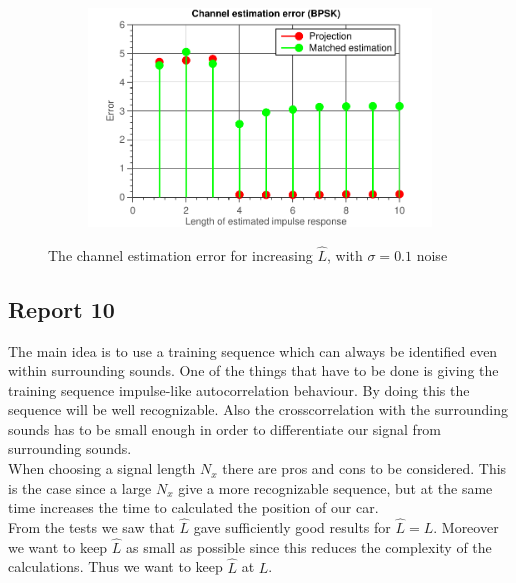 \documentclass[11pt,titlepage]{report}
\begin{document}
\begin{figure}[H]
\begin{subfigure}{0.49\textwidth}
	\end{subfigure}
	\begin{subfigure}{0.49\textwidth}
		\includegraphics[width=\textwidth]{../../deliverable-7-resources/figures/ass-1/report-8-9-10/report-9-noise-0.1/ass-1-report-9-BPSK.pdf}
	\end{subfigure}
	\caption{The channel estimation error for increasing $\hat{L}$, with $\sigma = 0.1$ noise}
	\label{fig:rep901}
\end{figure}


\subsection{Report 10}
The main idea is to use a training sequence which can always be identified even within surrounding sounds. One of the things that have to be done is giving the training sequence impulse-like autocorrelation behaviour. By doing this the sequence will be well recognizable. Also the crosscorrelation with the surrounding sounds has to be small enough in order to differentiate our signal from surrounding sounds. \\
When choosing a signal length $N_x$ there are pros and cons to be considered. This is the case since a large $N_x$ give a more recognizable sequence, but at the same time increases the time to calculated the position of our car. \\
From the tests we saw that $\hat{L}$ gave sufficiently good results for $\hat{L} = L$. Moreover we want to keep $\hat{L}$ as small as possible since this reduces the complexity of the calculations. Thus we want to keep $\hat{L}$ at $L$.
\end{document}
